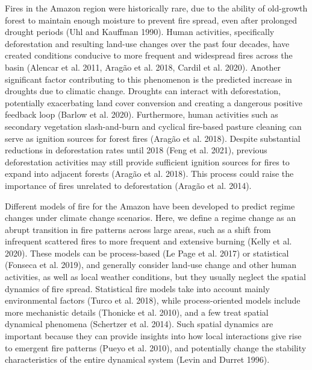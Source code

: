 \documentclass[
]{article}
\begin{document}
Fires in the Amazon region were historically rare, due to the ability of
old-growth forest to maintain enough moisture to prevent fire spread,
even after prolonged drought periods (Uhl and Kauffman 1990). Human
activities, specifically deforestation and resulting land-use changes
over the past four decades, have created conditions conducive to more
frequent and widespread fires across the basin (Alencar et al. 2011,
Aragão et al. 2018, Cardil et al. 2020). Another significant factor
contributing to this phenomenon is the predicted increase in droughts
due to climatic change. Droughts can interact with deforestation,
potentially exacerbating land cover conversion and creating a dangerous
positive feedback loop (Barlow et al. 2020). Furthermore, human
activities such as secondary vegetation slash-and-burn and cyclical
fire-based pasture cleaning can serve as ignition sources for forest
fires (Aragão et al. 2018). Despite substantial reductions in
deforestation rates until 2018 (Feng et al. 2021), previous
deforestation activities may still provide sufficient ignition sources
for fires to expand into adjacent forests (Aragão et al. 2018). This
process could raise the importance of fires unrelated to deforestation
(Aragão et al. 2014).

Different models of fire for the Amazon have been developed to predict
regime changes under climate change scenarios. Here, we define a regime
change as an abrupt transition in fire patterns across large areas, such
as a shift from infrequent scattered fires to more frequent and
extensive burning (Kelly et al. 2020). These models can be process-based
(Le Page et al. 2017) or statistical (Fonseca et al. 2019), and
generally consider land-use change and other human activities, as well
as local weather conditions, but they usually neglect the spatial
dynamics of fire spread. Statistical fire models take into account
mainly environmental factors (Turco et al. 2018), while process-oriented
models include more mechanistic details (Thonicke et al. 2010), and a
few treat spatial dynamical phenomena (Schertzer et al. 2014). Such
spatial dynamics are important because they can provide insights into
how local interactions give rise to emergent fire patterns (Pueyo et al.
2010), and potentially change the stability characteristics of the
entire dynamical system (Levin and Durret 1996).
\end{document}
